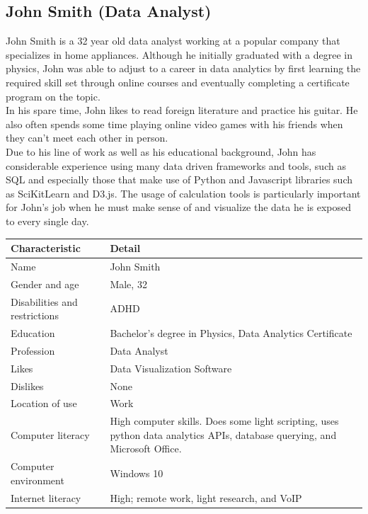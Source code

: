 \documentclass[11pt,onside]{report}
\begin{document}
\subsection{John Smith (Data Analyst)}
John Smith is a 32 year old data analyst working at a popular company that specializes in home appliances. Although he initially graduated with a degree in physics, John was able to adjust to a career in data analytics by first learning the required skill set through online courses and eventually completing a certificate program on the topic. \\

In his spare time, John likes to read foreign literature and practice his guitar. He also often spends some time playing online video games with his friends when they can’t meet each other in person.  \\

Due to his line of work as well as his educational background, John has considerable experience using many data driven frameworks and tools, such as SQL and especially those that make use of Python and Javascript libraries such as SciKitLearn and D3.js. The usage of calculation tools is particularly important for John’s job when he must make sense of and visualize the data he is exposed to every single day.
\begin{center}
    \begin{tabular}{|p{4cm}|p{10cm}|}
        \hline
        \bf{Characteristic} & \bf{Detail} \\
        \hline
        Name &   John Smith \\
        \hline
        Gender and age & Male, 32 \\
        \hline
        Disabilities and restrictions & ADHD \\
        \hline
        Education & Bachelor’s degree in Physics, Data Analytics Certificate \\
        \hline
        Profession & Data Analyst \\
        \hline
        Likes & Data Visualization Software \\
        \hline
        Dislikes & None \\
        \hline
        Location of use & Work \\
        \hline
        Computer literacy & High computer skills. Does some light scripting, uses python data analytics APIs, database querying, and Microsoft Office. \\
        \hline
        Computer environment &  Windows 10 \\
        \hline
        Internet literacy &  High; remote work, light research, and VoIP \\
        \hline
    \end{tabular}
\end{center}
\end{document}
